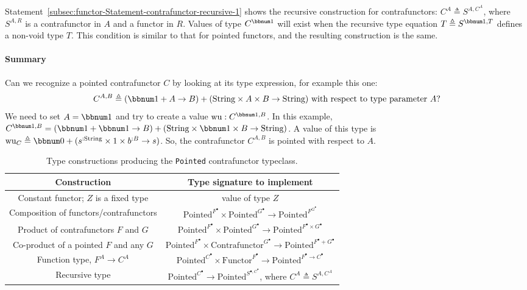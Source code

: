 Statement~\ref{subsec:functor-Statement-contrafunctor-recursive-1}
shows the recursive construction for contrafunctors: $C^{A}\triangleq S^{A,C^{A}}$,
where $S^{A,R}$ is a contrafunctor in $A$ and a functor in $R$.
Values of type $C^{\bbnum 1}$ will exist when the recursive type
equation $T\triangleq S^{\bbnum 1,T}$ defines a non-void type $T$.
This condition is similar to that for pointed functors, and the resulting
construction is the same.

\paragraph{Summary}

Can we recognize a pointed contrafunctor $C$ by looking at its type
expression, for example this one:
\[
C^{A,B}\triangleq\left(\bbnum 1+A\rightarrow B\right)+(\text{String}\times A\times B\rightarrow\text{String})\text{ with respect to type parameter }A?
\]
We need to set $A=\bbnum 1$ and try to create a value $\text{wu}:C^{\bbnum 1,B}$.
In this example, $C^{\bbnum 1,B}=\left(\bbnum 1+\bbnum 1\rightarrow B\right)+(\text{String}\times\bbnum 1\times B\rightarrow\text{String})$.
A value of this type is $\text{wu}_{C}\triangleq\bbnum 0+(s^{:\text{String}}\times1\times b^{:B}\rightarrow s)$.
So, the contrafunctor $C^{A,B}$ is pointed with respect to $A$.

\begin{table}
\begin{centering}
\begin{tabular}{|c|c|}
\hline 
\textbf{\footnotesize{}Construction} & \textbf{\footnotesize{}Type signature to implement}\tabularnewline
\hline 
\hline 
{\footnotesize{}Constant functor; $Z$ is a fixed type} & {\footnotesize{}value of type $Z$}\tabularnewline
\hline 
{\footnotesize{}Composition of functors/contrafunctors} & {\footnotesize{}$\text{Pointed}^{F^{\bullet}}\times\text{Pointed}^{G^{\bullet}}\rightarrow\text{Pointed}^{F^{G^{\bullet}}}$}\tabularnewline
\hline 
{\footnotesize{}Product of contrafunctors $F$ and $G$} & {\footnotesize{}$\text{Pointed}^{F^{\bullet}}\times\text{Pointed}^{G^{\bullet}}\rightarrow\text{Pointed}^{F^{\bullet}\times G^{\bullet}}$}\tabularnewline
\hline 
{\footnotesize{}Co-product of a pointed $F$ and any $G$} & {\footnotesize{}$\text{Pointed}^{F^{\bullet}}\times\text{Contrafunctor}^{G^{\bullet}}\rightarrow\text{Pointed}^{F^{\bullet}+G^{\bullet}}$}\tabularnewline
\hline 
{\footnotesize{}Function type, $F^{A}\rightarrow C^{A}$} & {\footnotesize{}$\text{Pointed}^{C^{\bullet}}\times\text{Functor}^{F^{\bullet}}\rightarrow\text{Pointed}^{F^{\bullet}\rightarrow C^{\bullet}}$}\tabularnewline
\hline 
{\footnotesize{}Recursive type} & {\footnotesize{}$\text{Pointed}^{C^{\bullet}}\rightarrow\text{Pointed}^{S^{\bullet,C^{\bullet}}}$,
where $C^{A}\triangleq S^{A,C^{A}}$}\tabularnewline
\hline 
\end{tabular}
\par\end{centering}
\caption{Type constructions producing the \lstinline!Pointed! contrafunctor
typeclass.\label{tab:Type-constructions-for-pointed-contrafunctor}}
\end{table}


